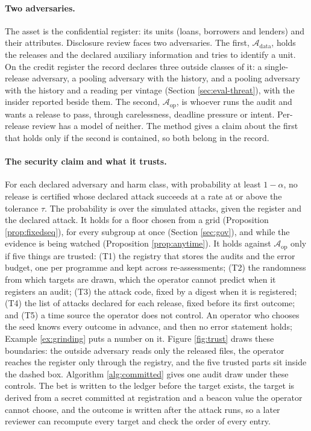 \documentclass[11pt,a4paper]{article}
\theoremstyle{plain}
\theoremstyle{definition}
\theoremstyle{definition}
\theoremstyle{plain}
\begin{document}
\paragraph{Two adversaries.} The asset is the confidential register: its units
(loans, borrowers and lenders) and their attributes. Disclosure review faces two
adversaries. The first, $\mathcal{A}_{\mathrm{data}}$, holds the releases and the
declared auxiliary information and tries to identify a unit. On the credit
register the record declares three outside classes of it: a single-release
adversary, a pooling adversary with the history, and a pooling adversary with the
history and a reading per vintage (Section \ref{sec:eval-threat}), with the
insider reported beside them. The second, $\mathcal{A}_{\mathrm{op}}$, is whoever
runs the audit and wants a release to pass, through carelessness, deadline
pressure or intent. Per-release review has a model of neither. The method gives a
claim about the first that holds only if the second is contained, so both belong
in the record.

\paragraph{The security claim and what it trusts.} For each declared adversary
and harm class, with probability at least $1-\alpha$, no release is certified
whose declared attack succeeds at a rate at or above the tolerance $\tau$. The
probability is over the simulated attacks, given the register and the declared
attack. It holds for a floor chosen from a grid (Proposition \ref{prop:fixedseq}),
for every subgroup at once (Section \ref{sec:gov}), and while the evidence is
being watched (Proposition \ref{prop:anytime}). It holds against
$\mathcal{A}_{\mathrm{op}}$ only if five things are trusted: (T1) the registry
that stores the audits and the error budget, one per programme and kept across
re-assessments;
(T2) the randomness from which targets are drawn, which the operator cannot
predict when it registers an audit; (T3) the attack code, fixed by a digest when
it is registered; (T4) the list of attacks declared for each release, fixed
before its first outcome; and (T5) a time source the operator does not control.
An operator who chooses the seed knows every outcome in advance, and then no
error statement holds; Example \ref{ex:grinding} puts a number on it.
Figure \ref{fig:trust} draws these boundaries: the outside adversary reads only
the released files, the operator reaches the register only through the registry,
and the five trusted parts sit inside the dashed box. Algorithm \ref{alg:committed}
gives one audit draw under these controls. The bet is written to the ledger before
the target exists, the target is derived from a secret committed at registration
and a beacon value the operator cannot choose, and the outcome is written after
the attack runs, so a later reviewer can recompute every target and check the
order of every entry.
\end{document}

